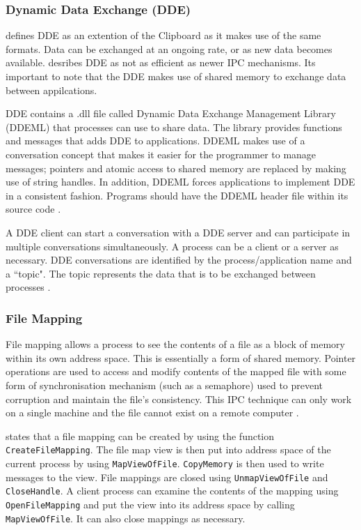 \documentclass[12pt,a4paper,oneside]{article}
\def\code#1{\texttt{#1}}
\begin{document}
    \subsubsection{Dynamic Data Exchange (DDE)}
      \cite{MSDN_API} defines DDE as an extention of the Clipboard as it makes use of the same formats. Data can be exchanged at an ongoing rate, or as new data becomes available. \cite{MSDN_API} desribes DDE as not as efficient as newer IPC mechanisms. Its important to note that the DDE makes use of shared memory to exchange data between appilcations.

      DDE contains a .dll file called Dynamic Data Exchange Management Library (DDEML) that processes can use to share data. The library provides functions and messages that adds DDE to applications. DDEML makes use of a conversation concept that makes it easier for the programmer to manage messages; pointers and atomic access to shared memory are replaced by making use of string handles. In addition, DDEML forces applications to implement DDE in a consistent fashion. Programs should have the DDEML header file within its source code \citep{MSDN_API}.

      A DDE client can start a conversation with a DDE server and can participate in multiple conversations simultaneously. A process can be a client or a server as necessary. DDE conversations are identified by the process/application name and a ``topic". The topic represents the data that is to be exchanged between processes \citep{MSDN_API}.

    \subsubsection{File Mapping}
      File mapping allows a process to see the contents of a file as a block of memory within its own address space. This is essentially a form of shared memory. Pointer operations are used to access and modify contents of the mapped file with some form of synchronisation mechanism (such as a semaphore) used to prevent corruption and maintain the file's consistency. This IPC technique can only work on a single machine and the file cannot exist on a remote computer \citep{MSDN_API}.

      \cite{IPCWindowsLinkedInSlides} states that a file mapping can be created by using the function \code{CreateFileMapping}. The file map view is then put into address space of the current process by using \code{MapViewOfFile}. \code{CopyMemory} is then used to write messages to the view. File mappings are closed using \code{UnmapViewOfFile} and \code{CloseHandle}. A client process can examine the contents of the mapping using \code{OpenFileMapping} and put the view into its address space by calling \code{MapViewOfFile}. It can also close mappings as necessary.
\end{document}
